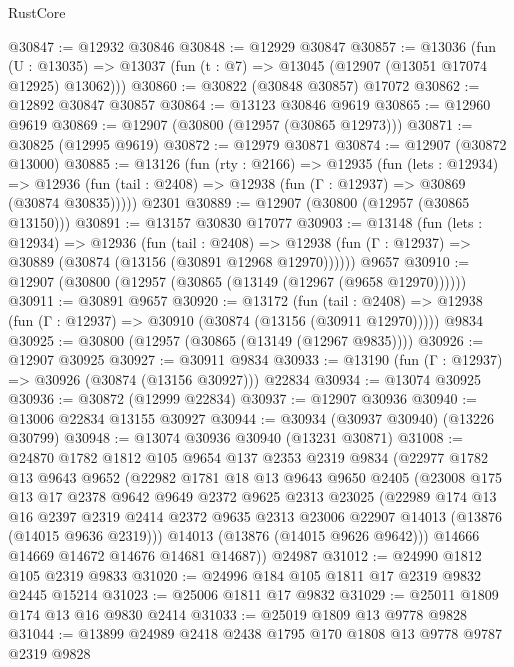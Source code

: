 \begin{lexlean}{RustCore}
\begin{coremodule}
@30847 := @12932 @30846
@30848 := @12929 @30847
@30857 := @13036
    (fun (U : @13035) => @13037 (fun (t : @7) => @13045 (@12907 (@13051 @17074 @12925) @13062)))
@30860 := @30822 (@30848 @30857) @17072
@30862 := @12892 @30847 @30857
@30864 := @13123 @30846 @9619
@30865 := @12960 @9619
@30869 := @12907 (@30800 (@12957 (@30865 @12973)))
@30871 := @30825 (@12995 @9619)
@30872 := @12979 @30871
@30874 := @12907 (@30872 @13000)
@30885 := @13126
    (fun (rty : @2166) =>
    @12935
      (fun (lets : @12934) =>
      @12936 (fun (tail : @2408) => @12938 (fun (Γ : @12937) => @30869 (@30874 @30835)))))
    @2301
@30889 := @12907 (@30800 (@12957 (@30865 @13150)))
@30891 := @13157 @30830 @17077
@30903 := @13148
    (fun (lets : @12934) =>
    @12936
      (fun (tail : @2408) =>
      @12938 (fun (Γ : @12937) => @30889 (@30874 (@13156 (@30891 @12968 @12970))))))
    @9657
@30910 := @12907 (@30800 (@12957 (@30865 (@13149 (@12967 (@9658 @12970))))))
@30911 := @30891 @9657
@30920 := @13172
    (fun (tail : @2408) => @12938 (fun (Γ : @12937) => @30910 (@30874 (@13156 (@30911 @12970)))))
    @9834
@30925 := @30800 (@12957 (@30865 (@13149 (@12967 @9835))))
@30926 := @12907 @30925
@30927 := @30911 @9834
@30933 := @13190 (fun (Γ : @12937) => @30926 (@30874 (@13156 @30927))) @22834
@30934 := @13074 @30925
@30936 := @30872 (@12999 @22834)
@30937 := @12907 @30936
@30940 := @13006 @22834 @13155 @30927
@30944 := @30934 (@30937 @30940) (@13226 @30799)
@30948 := @13074 @30936 @30940 (@13231 @30871)
@31008 := @24870
    @1782
    @1812
    @105
    @9654
    @137
    @2353
    @2319
    @9834
    (@22977
      @1782
      @13
      @9643
      @9652
      (@22982
        @1781
        @18
        @13
        @9643
        @9650
        @2405
        (@23008
          @175
          @13
          @17
          @2378
          @9642
          @9649
          @2372
          @9625
          @2313
          @23025
          (@22989
            @174
            @13
            @16
            @2397
            @2319
            @2414
            @2372
            @9635
            @2313
            @23006
            @22907
            @14013
            (@13876 (@14015 @9636 @2319)))
          @14013
          (@13876 (@14015 @9626 @9642)))
        @14666
        @14669
        @14672
        @14676
        @14681
        @14687))
    @24987
@31012 := @24990 @1812 @105 @2319 @9833
@31020 := @24996 @184 @105 @1811 @17 @2319 @9832 @2445 @15214
@31023 := @25006 @1811 @17 @9832
@31029 := @25011 @1809 @174 @13 @16 @9830 @2414
@31033 := @25019 @1809 @13 @9778 @9828
@31044 := @13899 @24989 @2418 @2438 @1795 @170 @1808 @13 @9778 @9787 @2319 @9828

\end{coremodule}
\end{lexlean}
